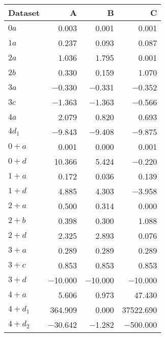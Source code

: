 \begin{tabular}{lrrr}
\toprule
 Dataset   &       A &       B &         C \\
\midrule
 $0 a$     &   \num{0.003} &   \num{0.001} &     \num{0.001} \\
 $1 a$     &   \num{0.237} &   \num{0.093} &     \num{0.087} \\
 $2 a$     &   \num{1.036} &   \num{1.795} &     \num{0.001} \\
 $2 b$     &   \num{0.330} &   \num{0.159} &     \num{1.070} \\
 $3 a$     &  \num{-0.330} &  \num{-0.331} &    \num{-0.352} \\
 $3 c$     &  \num{-1.363} &  \num{-1.363} &    \num{-0.566} \\
 $4 a$     &   \num{2.079} &   \num{0.820} &     \num{0.693} \\
 $4 d_1$   &  \num{-9.843} &  \num{-9.408} &    \num{-9.875} \\
 $0+ a$    &   \num{0.001} &   \num{0.000} &     \num{0.001} \\
 $0+ d$    &  \num{10.366} &   \num{5.424} &    \num{-0.220} \\
 $1+ a$    &   \num{0.172} &   \num{0.036} &     \num{0.139} \\
 $1+ d$    &   \num{4.885} &   \num{4.303} &    \num{-3.958} \\
 $2+ a$    &   \num{0.500} &   \num{0.314} &     \num{0.000} \\
 $2+ b$    &   \num{0.398} &   \num{0.300} &     \num{1.088} \\
 $2+ d$    &   \num{2.325} &   \num{2.893} &     \num{0.076} \\
 $3+ a$    &   \num{0.289} &   \num{0.289} &     \num{0.289} \\
 $3+ c$    &   \num{0.853} &   \num{0.853} &     \num{0.853} \\
 $3+ d$    & \num{-10.000} & \num{-10.000} &   \num{-10.000} \\
 $4+ a$    &   \num{5.606} &   \num{0.973} &    \num{47.430} \\
 $4+ d_1$  & \num{364.909} &   \num{0.000} & \num{37522.690} \\
 $4+ d_2$  & \num{-30.642} &  \num{-1.282} &  \num{-500.000} \\
\bottomrule
\end{tabular}